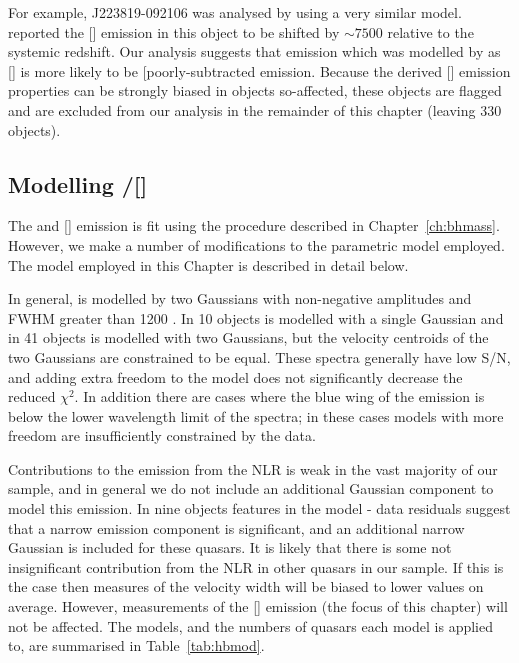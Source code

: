 For example, J223819-092106 was analysed by \citet{shen16a} using a very similar model. 
\citet{shen16a} reported the [] emission in this object to be shifted by $\sim7500$ \kms relative to the \citet{hewett10} systemic redshift. 
Our analysis suggests that emission which was modelled by \citet{shen16a} as [] is more likely to be [poorly-subtracted  emission.  
Because the derived [] emission properties can be strongly biased in objects so-affected, these objects are flagged and are excluded from our analysis in the remainder of this chapter (leaving 330 objects). 

\subsection{Modelling \hbns/[]}
\label{sec:oiiimodel}

The \hb and [] emission is fit using the procedure described in Chapter~\ref{ch:bhmass}. 
However, we make a number of modifications to the parametric model employed.
The model employed in this Chapter is described in detail below.  

In general, \hb is modelled by two Gaussians with non-negative amplitudes and FWHM greater than 1200 \kms.
In 10 objects \hb is modelled with a single Gaussian and in 41 objects \hb is modelled with two Gaussians, but the velocity centroids of the two Gaussians are constrained to be equal. 
These spectra generally have low S/N, and adding extra freedom to the model does not significantly decrease the  reduced $\chi^2$.
In addition there are cases where the blue wing of the \hb emission is below the lower wavelength limit of the spectra; in these cases models with more freedom are insufficiently constrained by the data.    

Contributions to the \hb emission from the NLR is weak in the vast majority of our sample, and in general we do not include an additional Gaussian component to model this emission. 
In nine objects features in the model - data residuals suggest that a narrow emission component is significant, and an additional narrow Gaussian is included for these quasars. 
It is likely that there is some not insignificant contribution from the NLR in other quasars in our sample. 
If this is the case then measures of the \hb velocity width will be biased to lower values on average. 
However, measurements of the [] emission (the focus of this chapter) will not be affected. 
The \hb models, and the numbers of quasars each model is applied to, are summarised in Table~\ref{tab:hbmod}. 

